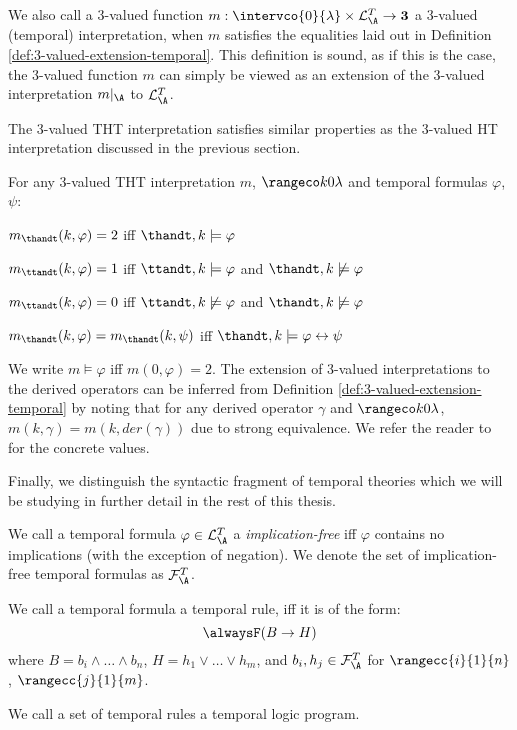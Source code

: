 We also call a 3-valued function
$m: \intervco{0}{\lambda} \times \mathcal{L}_{\A}^{T} \rightarrow
\textbf{3}$ a 3-valued (temporal) interpretation, when $m$ satisfies
the equalities laid out in Definition
\ref{def:3-valued-extension-temporal}. This definition is sound, as if
this is the case, the 3-valued function $m$ can simply be viewed as an
extension of the 3-valued interpretation $m\vert_\A$ to
$\mathcal{L}_{\A}^{T}$.

The 3-valued THT interpretation satisfies similar properties as the
3-valued HT interpretation discussed in the previous section.

\begin{proposition}\label{prop:3-valued-temporal-properties}
  For any 3-valued THT interpretation $m$, $\kinlambda$ and temporal
  formulas $\varphi$, $\psi$:
\begin{description}
\item $m_{\thandt}(k,\varphi) = 2$ iff $\thandt,k \models \varphi$
\item $m_{\ttandt}(k,\varphi) = 1$ iff $\ttandt,k \models \varphi$ and $\thandt,k \not\models \varphi$
  \item $m_{\ttandt}(k,\varphi) = 0$ iff $\ttandt,k \not\models \varphi$ and $\thandt,k \not\models \varphi$
\item $m_{\thandt}(k,\varphi) = m_{\thandt}(k,\psi)$ iff $\thandt,k \models \varphi \leftrightarrow \psi$
\end{description}
\end{proposition}

We write $m \models \varphi$ iff $m(0,\varphi)=2$. The extension of
3-valued interpretations to the derived operators can be inferred from
Definition \ref{def:3-valued-extension-temporal} by noting that for
any derived operator $\gamma$ and $\kinlambda$,
$m(k,\gamma)=m(k,der(\gamma))$ due to strong equivalence. We refer the
reader to \cite{agcadipescscvi20a} for the concrete values.

Finally, we distinguish the syntactic fragment of temporal theories
which we will be studying in further detail in the rest of this thesis.

\begin{definition}
  We call a temporal formula $\varphi \in \mathcal{L}_{\A}^{T}$ a
  \emph{implication-free} iff $\varphi$ contains no implications (with
  the exception of negation). We denote the set of implication-free
  temporal formulas as $\mathcal{F}_{\A}^{T}$.
  
  We call a temporal formula a temporal rule, iff it is of the form:
  $$
  \tempruleshort
  $$
  where $B=b_i \land \dots \land b_n$, $H=h_1 \lor \dots \lor h_m$,
  and $b_i,h_j \in \mathcal{F}_{\A}^{T}$ for $\rangecc{i}{1}{n}$,
  $\rangecc{j}{1}{m}$.  

  We call a set of temporal rules a temporal logic program.
\end{definition}

